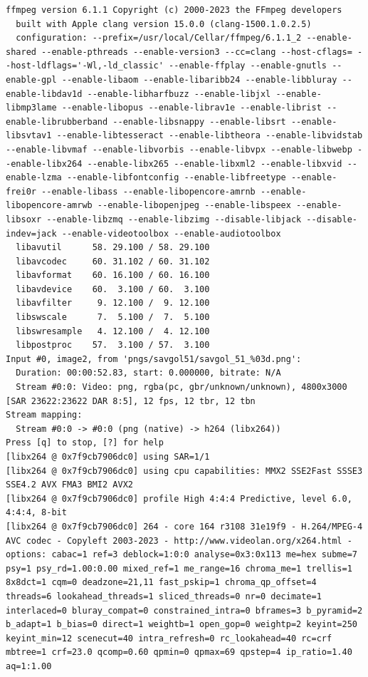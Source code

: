 \documentclass[
  letterpaper,
  DIV=11,
  numbers=noendperiod,
  oneside]{scrreprt}
\begin{document}
\begin{verbatim}
ffmpeg version 6.1.1 Copyright (c) 2000-2023 the FFmpeg developers
  built with Apple clang version 15.0.0 (clang-1500.1.0.2.5)
  configuration: --prefix=/usr/local/Cellar/ffmpeg/6.1.1_2 --enable-shared --enable-pthreads --enable-version3 --cc=clang --host-cflags= --host-ldflags='-Wl,-ld_classic' --enable-ffplay --enable-gnutls --enable-gpl --enable-libaom --enable-libaribb24 --enable-libbluray --enable-libdav1d --enable-libharfbuzz --enable-libjxl --enable-libmp3lame --enable-libopus --enable-librav1e --enable-librist --enable-librubberband --enable-libsnappy --enable-libsrt --enable-libsvtav1 --enable-libtesseract --enable-libtheora --enable-libvidstab --enable-libvmaf --enable-libvorbis --enable-libvpx --enable-libwebp --enable-libx264 --enable-libx265 --enable-libxml2 --enable-libxvid --enable-lzma --enable-libfontconfig --enable-libfreetype --enable-frei0r --enable-libass --enable-libopencore-amrnb --enable-libopencore-amrwb --enable-libopenjpeg --enable-libspeex --enable-libsoxr --enable-libzmq --enable-libzimg --disable-libjack --disable-indev=jack --enable-videotoolbox --enable-audiotoolbox
  libavutil      58. 29.100 / 58. 29.100
  libavcodec     60. 31.102 / 60. 31.102
  libavformat    60. 16.100 / 60. 16.100
  libavdevice    60.  3.100 / 60.  3.100
  libavfilter     9. 12.100 /  9. 12.100
  libswscale      7.  5.100 /  7.  5.100
  libswresample   4. 12.100 /  4. 12.100
  libpostproc    57.  3.100 / 57.  3.100
Input #0, image2, from 'pngs/savgol51/savgol_51_%03d.png':
  Duration: 00:00:52.83, start: 0.000000, bitrate: N/A
  Stream #0:0: Video: png, rgba(pc, gbr/unknown/unknown), 4800x3000 [SAR 23622:23622 DAR 8:5], 12 fps, 12 tbr, 12 tbn
Stream mapping:
  Stream #0:0 -> #0:0 (png (native) -> h264 (libx264))
Press [q] to stop, [?] for help
[libx264 @ 0x7f9cb7906dc0] using SAR=1/1
[libx264 @ 0x7f9cb7906dc0] using cpu capabilities: MMX2 SSE2Fast SSSE3 SSE4.2 AVX FMA3 BMI2 AVX2
[libx264 @ 0x7f9cb7906dc0] profile High 4:4:4 Predictive, level 6.0, 4:4:4, 8-bit
[libx264 @ 0x7f9cb7906dc0] 264 - core 164 r3108 31e19f9 - H.264/MPEG-4 AVC codec - Copyleft 2003-2023 - http://www.videolan.org/x264.html - options: cabac=1 ref=3 deblock=1:0:0 analyse=0x3:0x113 me=hex subme=7 psy=1 psy_rd=1.00:0.00 mixed_ref=1 me_range=16 chroma_me=1 trellis=1 8x8dct=1 cqm=0 deadzone=21,11 fast_pskip=1 chroma_qp_offset=4 threads=6 lookahead_threads=1 sliced_threads=0 nr=0 decimate=1 interlaced=0 bluray_compat=0 constrained_intra=0 bframes=3 b_pyramid=2 b_adapt=1 b_bias=0 direct=1 weightb=1 open_gop=0 weightp=2 keyint=250 keyint_min=12 scenecut=40 intra_refresh=0 rc_lookahead=40 rc=crf mbtree=1 crf=23.0 qcomp=0.60 qpmin=0 qpmax=69 qpstep=4 ip_ratio=1.40 aq=1:1.00

\end{verbatim}
\end{document}
